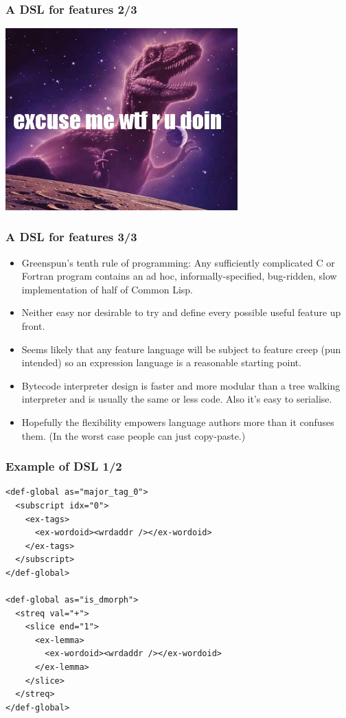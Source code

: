 \documentclass{beamer}
\begin{document}
\begin{frame}
\frametitle{A DSL for features 2/3}
\begin{center}
  \includegraphics[height=7cm]{excuse-me-wtf-are-you-doing.jpg}
\end{center}
\end{frame}

\begin{frame}
\frametitle{A DSL for features 3/3}
\begin{itemize}

  \item Greenspun's tenth rule of programming: Any sufficiently complicated C
    or Fortran program contains an ad hoc, informally-specified, bug-ridden,
    slow implementation of half of Common Lisp.

  \item Neither easy nor desirable to try and define every possible useful
    feature up front.

  \item Seems likely that any feature language will be subject to feature creep
    (pun intended) so an expression language is a reasonable starting point.

  \item Bytecode interpreter design is faster and more modular than a tree
    walking interpreter and is usually the same or less code. Also it's easy to
    serialise.

  \item Hopefully the flexibility empowers language authors more than it
    confuses them. (In the worst case people can just copy-paste.)

\end{itemize}
\end{frame}

\begin{frame}[fragile]
\frametitle{Example of DSL 1/2}
{\scriptsize
\begin{verbatim}
<def-global as="major_tag_0">
  <subscript idx="0">
    <ex-tags>
      <ex-wordoid><wrdaddr /></ex-wordoid>
    </ex-tags>
  </subscript>
</def-global>

<def-global as="is_dmorph">
  <streq val="+">
    <slice end="1">
      <ex-lemma>
        <ex-wordoid><wrdaddr /></ex-wordoid>
      </ex-lemma>
    </slice>
  </streq>
</def-global>
\end{verbatim}
}

\end{frame}
\end{document}
